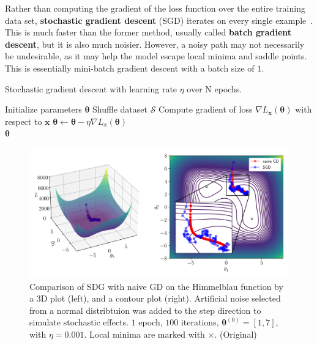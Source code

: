 \documentclass[12pt]{report}
\theoremstyle{definition}
\theoremstyle{remark}
\begin{document}
Rather than computing the gradient of the loss function over the entire training data set, \textbf{stochastic gradient descent} (SGD) iterates on every single example~\cite{bishop_deep_2023, ruder_overview_2017}. This is much faster than the former method, usually called \textbf{batch gradient descent}, but it is also much noisier. However, a noisy path may not necessarily be undesirable, as it may help the model escape local minima and saddle points. This is essentially mini-batch gradient descent with a batch size of $1$.

\begin{algorithm}
    \caption{Stochastic gradient descent with learning rate $\eta$ over N epochs.}\label{alg:sgd}
    \begin{algorithmic}[1]
        \State Initialize parameters $\boldsymbol{\theta}$
            \State Shuffle dataset $\mathcal{S}$
                \State Compute gradient of loss $\nabla L_\mathbf{x}(\boldsymbol{\theta})$ with respect to $\mathbf{x}$
                \State $\boldsymbol{\theta} \leftarrow \boldsymbol{\theta} - \eta \nabla L_x(\boldsymbol{\theta})$
            \EndFor
        \EndFor \\
        \Return $\boldsymbol{\theta}$
    \end{algorithmic}
\end{algorithm}
\begin{figure}[h]
    \centering
    \includegraphics[width=\linewidth]{figs/stochastic_comparison.png}
    \caption{Comparison of SDG with naive GD on the Himmelblau function by a 3D plot (left), and a contour plot (right). Artificial noise selected from a normal distribtuion was added to the step direction to simulate stochastic effects. $1$ epoch, $100$ iterations, $\boldsymbol{\theta}^{(0)} = [1,7]$, with $\eta = 0.001$. Local minima are marked with $\times$. (Original)}
    \label{fig:enter-label}
\end{figure}
\end{document}
